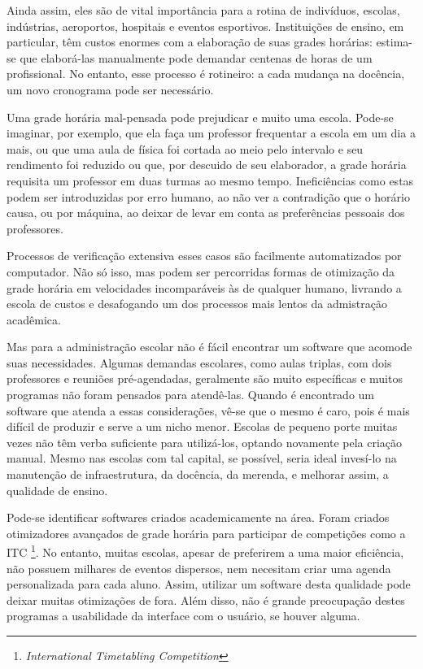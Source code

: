 \documentclass[12pt,a4paper]{article}
\begin{document}
			\par Ainda assim, eles são de vital importância para a rotina de indivíduos, escolas, indústrias, aeroportos, hospitais e eventos esportivos. Instituições de ensino, em particular, têm custos enormes com a elaboração de suas grades horárias: estima-se que elaborá-las manualmente pode demandar centenas de horas \cite{appleby} de um profissional. No entanto, esse processo é rotineiro: a cada mudança na docência, um novo cronograma pode ser necessário.

			\par Uma grade horária mal-pensada pode prejudicar e muito uma escola. Pode-se imaginar, por exemplo, que ela faça um professor frequentar a escola em um dia a mais, ou que uma aula de física foi cortada ao meio pelo intervalo e seu rendimento foi reduzido ou que, por descuido de seu elaborador, a grade horária requisita um professor em duas turmas ao mesmo tempo. Ineficiências como estas podem ser introduzidas por erro humano, ao não ver a contradição que o horário causa, ou por máquina, ao deixar de levar em conta as preferências pessoais dos professores.

			\par Processos de verificação extensiva esses casos são facilmente automatizados por computador. Não só isso, mas podem ser percorridas formas de otimização da grade horária em velocidades incomparáveis às de qualquer humano, livrando a escola de custos e desafogando um dos processos mais lentos da admistração acadêmica.

			\par Mas para a administração escolar não é fácil encontrar um software que acomode suas necessidades. Algumas demandas escolares, como aulas triplas, com dois professores e reuniões pré-agendadas, geralmente são muito específicas e muitos programas não foram pensados para atendê-las. Quando é encontrado um software que atenda a essas considerações, vê-se que o mesmo é caro, pois é mais difícil de produzir e serve a um nicho menor. Escolas de pequeno porte muitas vezes não têm verba suficiente para utilizá-los, optando novamente pela criação manual. Mesmo nas escolas com tal capital, se possível, seria ideal invesí-lo na manutenção de infraestrutura, da docência, da merenda, e melhorar assim, a qualidade de ensino.

			\par Pode-se identificar softwares criados academicamente na área. Foram criados otimizadores avançados de grade horária para participar de competições como a ITC \footnote{\textit{International Timetabling Competition}}. No entanto, muitas escolas, apesar de preferirem a uma maior eficiência, não possuem milhares de eventos dispersos, nem necesitam criar uma agenda personalizada para cada aluno. Assim, utilizar um software desta qualidade pode deixar muitas otimizações de fora. Além disso, não é grande preocupação destes programas a usabilidade da interface com o usuário, se houver alguma.
\end{document}
